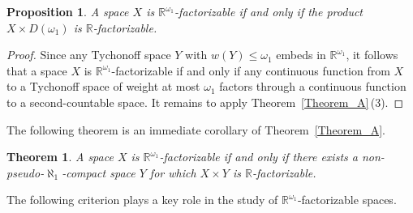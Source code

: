 \documentclass[a4paper,12pt]{amsart}
\newtheorem{theorem}{Theorem}[section]
\newtheorem{proposition}{Proposition}[section]
\theoremstyle{definition}
\theoremstyle{remark}
\begin{document}
\begin{proposition}
A space $X$ is $\mathbb R^{\omega_1}$-factorizable if and only if 
the product $X\times D(\omega_1)$ is $\mathbb R$-factorizable. 
\end{proposition}

\begin{proof}
Since any Tychonoff space $Y$ with $w(Y)\le \omega_1$ embeds in $\mathbb R^{\omega_1}$, it follows that a 
space $X$ is $\mathbb R^{\omega_1}$-factorizable if and only if any continuous function from $X$ to a 
Tychonoff space of weight at most $\omega_1$ factors through a continuous function to a second-countable space. 
It remains to apply Theorem~\ref{Theorem_A}\,(3).
\end{proof}

The following theorem is an immediate corollary of Theorem~\ref{Theorem_A}. 

\begin{theorem}
\label{Theorem_3.1}
A space $X$ is $\mathbb R^{\omega_1}$-factorizable if and only if 
there exists a non-pseudo-$\aleph_1$-compact space $Y$ for which $X\times Y$ is $\mathbb R$-factorizable.
\end{theorem}

The following criterion plays a key role in the study of $\mathbb R^{\omega_1}$-factorizable spaces. 
\end{document}
